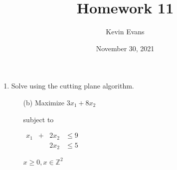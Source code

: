 \documentclass{homework}
\title{Homework 11}
\author{Kevin Evans}
\date{November 30, 2021}
\newcommand{\bolditem}[1][YYY]{\item[\textbf{#1}]}
\begin{document}
	\maketitle
	\begin{enumerate}
		\bolditem[6.3.2] Solve using the cutting plane algorithm. \begin{enumerate}
			\item[(b)] 
			 Maximize $3x_1 + 8x_2$ 

				subject to
				
				$\begin{matrix}
					x_1 & + & 2x_2 & \le 9 \\
					& & 2x_2 & \le 5
				\end{matrix}$
			
				
				$x \ge 0, x \in \mathbb{Z}^2$
				

\end{enumerate}
\end{enumerate}
\end{document}
